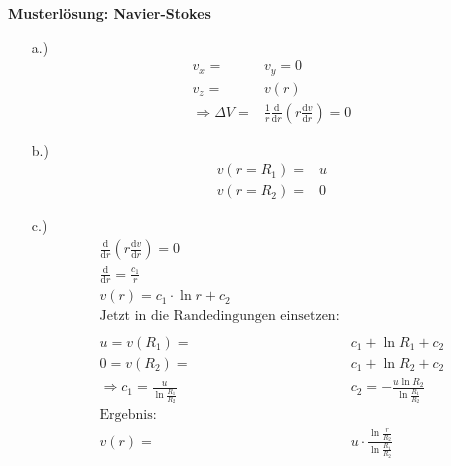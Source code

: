 \textbf{Musterlösung: Navier-Stokes}

\begin{itemize}
  \item[a.)]
    \begin{align*}
      v_x =& v_y = 0\\
      v_z =& v(r)\\
      \Rightarrow \Delta V =& \frac{1}{r}\frac{\text{d}}{\text{d}r}
      \left(r\frac{\text{d}v}{\text{d}r}\right) = 0
    \end{align*}
  \item[b.)]
    \begin{align*}
      v(r = R_1) =& u\\
      v(r = R_2) =& 0
    \end{align*}
  \item[c.)]
    \begin{align*}
      \frac{\text{d}}{\text{d}r}
      \left(r\frac{\text{d}v}{\text{d}r}\right) = 0\\
      \frac{\text{d}}{\text{d}r} = \frac{c_1}{r}\\
      v(r) = c_1\cdot \ln{r} + c_2\\
      \text{Jetzt in die Randedingungen einsetzen:}\\
      \\
      u = v(R_1) =& c_1 + \ln{R_1} + c_2\\
      0 = v(R_2) =& c_1 + \ln{R_2} + c_2\\
      \Rightarrow c_1 = \frac{u}{\ln{\frac{R_1}{R_2}}} &
      c_2 = -\frac{u\ln{R_2}}{\ln{\frac{R_1}{R_2}}}\\
      \text{Ergebnis:}\\
      v(r) =& u\cdot\frac{\ln{\frac{r}{R_2}}}{\ln{\frac{R_1}{R_2}}}
    \end{align*}
\end{itemize}
